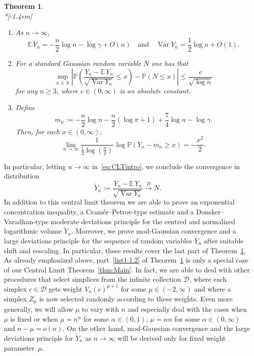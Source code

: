 \documentclass[10pt]{amsart}
\newtheorem{theo}{Theorem}[section]
\theoremstyle{definition}\newtheorem{defi}[theo]{Definition}\newtheorem{rema}[theo]{Remark}\newtheorem{exam}[theo]{Example}\newtheorem{exem}[theo]{Example}\newtheorem{nota}[theo]{Notation}
\newcommand{\R}{\mathbb{R}}
\newcommand{\EE}{\mathbb{E}\,}
\newcommand{\PP}{\mathbb{P}}
\newcommand{\dscr}{\mathcal{D}}
\newcommand{\Var}{\mathop{\mathrm{Var}}\nolimits}
\newcommand*{\romanenumi}{\renewcommand*{\theenumi}{\roman{enumi}}}
\begin{document}
\begin{theo}\label{thm:Intro}\ \\*[-1.4em]
\begin{enumerate}\romanenumi
\item \label{list1.1.1}As $n\to\infty$,
\[
\EE Y_n = -\frac{n}{2}\log n -\log\gamma +O(n)\quad\text{and}\quad\Var Y_n = \frac{1}{2}\log n+O(1).
\]

\item \label{list1.1.2}For a standard Gaussian random variable $N$ one has that
\begin{equation}\label{eq:CLTintro}
\sup_{x\,\in\,\R}\left|\PP\left(\frac{Y_n-\EE Y_n}{\sqrt{\Var Y_n}}\leq x\right)-\PP(N\leq x)\right| \leq \frac{c}{\sqrt{\log n}}
\end{equation}
for any $n\geq 3$, where $c\in(0,\infty)$ is an absolute constant.
\item \label{list1.1.3}Define
\[
m_n:=-\frac{n}{2}\log n-\frac{n}{2}(\log\pi +1)+\frac{7}{4}\log n -\log\gamma.
\]
Then, for each $x\in(0,\infty)$,
\[
\lim_{n\to\infty}\frac{1}{\frac{1}{2}\log(\frac{n}{2})}\,\log\PP(Y_n-m_n\geq x) = -\frac{x^2}{2}.
\]
\end{enumerate}
\end{theo}

In particular, letting $n\to\infty$ in~\eqref{eq:CLTintro}, we conclude the convergence in distribution
\[
\widetilde{Y}_{n}:=\frac{Y_n-\EE Y_n}{\sqrt{\Var Y_n}} \overset{D}{\longrightarrow} N.
\]
In addition to this central limit theorem we are able to prove an exponential concentration inequality, a Cramér--Petrov-type estimate and a Donsker--Varadhan-type moderate deviations principle for the centred and normalized logarithmic volume $\widetilde{Y}_{n}$. Moreover, we prove mod-Gaussian convergence and a large deviations principle for the sequence of random variables $Y_n$ after suitable shift and rescaling. In particular, these results cover the last part of Theorem~\ref{thm:Intro}. As already emphasized above, part~\eqref{list1.1.2} of Theorem~\ref{thm:Intro} is only a special case of our Central Limit Theorem~\ref{thm:Main}. In fact, we are able to deal with other procedures that select simplices from the infinite collection $\dscr$, where each simplex $c\in\dscr$ gets weight $V_n(c)^{\mu+1}$ for some $\mu\in(-2,\infty)$ and where a simplex $Z_{\mu}$ is now selected randomly according to these weights. Even more generally, we will allow $\mu$ to vary with $n$ and especially deal with the cases when $\mu$ is fixed or when $\mu=n^\alpha$ for some $\alpha\in(0,1)$, $\mu=\alpha n$ for some $\alpha\in(0,\infty)$ and $n-\mu=o(n)$. On the other hand, mod-Gaussian convergence and the large deviations principle for $\widetilde{Y}_n$ as $n\to\infty$ will be derived only for fixed weight parameter~$\mu$.
\end{document}
